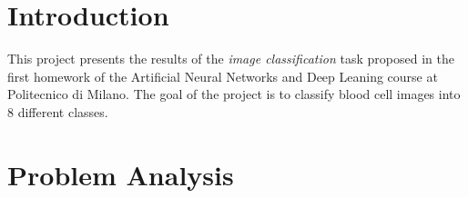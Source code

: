 \documentclass[11pt]{article}
\begin{document}
\begin{multicols}{2}

    \section{Introduction}


    This project presents the results of the \textit{image classification} task
    proposed in the first homework of the Artificial Neural Networks and Deep
    Leaning course at Politecnico di Milano. The goal of the project is to
    classify blood cell images into 8 different classes.

    \section{Problem Analysis}


\end{multicols}
\end{document}
